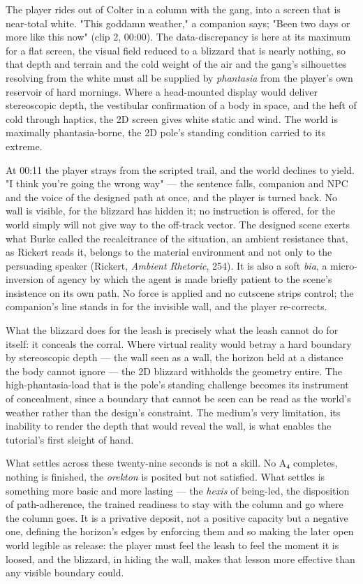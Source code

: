 \documentclass{article}
\begin{document}
The player rides out of Colter in a column with the gang, into a screen that is near-total white. "This goddamn weather," a companion says; "Been two days or more like this now" (clip 2, 00:00). The data-discrepancy is here at its maximum for a flat screen, the visual field reduced to a blizzard that is nearly nothing, so that depth and terrain and the cold weight of the air and the gang's silhouettes resolving from the white must all be supplied by \textit{phantasia} from the player's own reservoir of hard mornings. Where a head-mounted display would deliver stereoscopic depth, the vestibular confirmation of a body in space, and the heft of cold through haptics, the 2D screen gives white static and wind. The world is maximally phantasia-borne, the 2D pole's standing condition carried to its extreme.

At 00:11 the player strays from the scripted trail, and the world declines to yield. "I think you're going the wrong way" — the sentence falls, companion and NPC and the voice of the designed path at once, and the player is turned back. No wall is visible, for the blizzard has hidden it; no instruction is offered, for the world simply will not give way to the off-track vector. The designed scene exerts what Burke called the recalcitrance of the situation, an ambient resistance that, as Rickert reads it, belongs to the material environment and not only to the persuading speaker (Rickert, \textit{Ambient Rhetoric}, 254). It is also a soft \textit{bia}, a micro-inversion of agency by which the agent is made briefly patient to the scene's insistence on its own path. No force is applied and no cutscene strips control; the companion's line stands in for the invisible wall, and the player re-corrects.

What the blizzard does for the leash is precisely what the leash cannot do for itself: it conceals the corral. Where virtual reality would betray a hard boundary by stereoscopic depth — the wall seen as a wall, the horizon held at a distance the body cannot ignore — the 2D blizzard withholds the geometry entire. The high-phantasia-load that is the pole's standing challenge becomes its instrument of concealment, since a boundary that cannot be seen can be read as the world's weather rather than the design's constraint. The medium's very limitation, its inability to render the depth that would reveal the wall, is what enables the tutorial's first sleight of hand.

What settles across these twenty-nine seconds is not a skill. No A₄ completes, nothing is finished, the \textit{orekton} is posited but not satisfied. What settles is something more basic and more lasting — the \textit{hexis} of being-led, the disposition of path-adherence, the trained readiness to stay with the column and go where the column goes. It is a privative deposit, not a positive capacity but a negative one, defining the horizon's edges by enforcing them and so making the later open world legible as release: the player must feel the leash to feel the moment it is loosed, and the blizzard, in hiding the wall, makes that lesson more effective than any visible boundary could.
\end{document}
